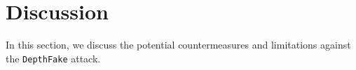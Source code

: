 
\section{Discussion}
 In this section, we discuss the potential countermeasures and limitations against the \texttt{DepthFake} attack.




